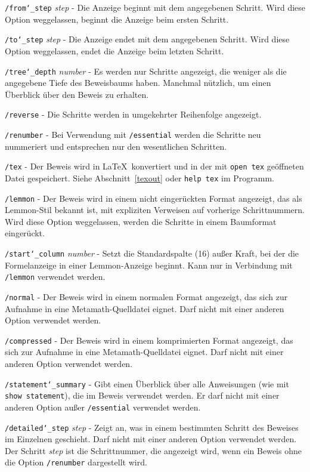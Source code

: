     \texttt{/from{\char`\_}step} {\em step} - Die Anzeige beginnt mit dem angegebenen Schritt.  Wird diese Option weggelassen, beginnt die Anzeige beim ersten Schritt.

    \texttt{/to{\char`\_}step} {\em step} - Die Anzeige endet mit dem angegebenen Schritt.  Wird diese Option weggelassen, endet die Anzeige beim letzten Schritt.

    \texttt{/tree{\char`\_}depth} {\em number} - Es werden nur Schritte angezeigt, die weniger als die angegebene Tiefe des Beweisbaums haben.  Manchmal nützlich, um einen Überblick über den Beweis zu erhalten.

    \texttt{/reverse} - Die Schritte werden in umgekehrter Reihenfolge angezeigt.

    \texttt{/renumber} - Bei Verwendung mit \texttt{/essential} werden die Schritte neu nummeriert und entsprechen nur den wesentlichen Schritten.

    \texttt{/tex} - Der Beweis wird in \LaTeX\ konvertiert und in der mit \texttt{open tex} geöffneten Datei gespeichert.  Siehe Abschnitt~\ref{texout} oder \texttt{help tex} im Programm.

    \texttt{/lemmon} - Der Beweis wird in einem nicht eingerückten Format angezeigt, das als Lemmon-Stil bekannt ist, mit expliziten Verweisen auf vorherige Schrittnummern. Wird diese Option weggelassen, werden die Schritte in einem Baumformat eingerückt.

    \texttt{/start{\char`\_}column} {\em number} - Setzt die Standardspalte (16) außer Kraft, bei der die Formelanzeige in einer Lemmon-Anzeige beginnt.  Kann nur in Verbindung mit \texttt{/lemmon} verwendet werden.

    \texttt{/normal} - Der Beweis wird in einem normalen Format angezeigt, das sich zur Aufnahme in eine Metamath-Quelldatei eignet.  Darf nicht mit einer anderen Option verwendet werden.

    \texttt{/compressed} - Der Beweis wird in einem komprimierten Format angezeigt, das sich zur Aufnahme in eine Metamath-Quelldatei eignet.  Darf nicht mit einer anderen Option verwendet werden.

    \texttt{/statement{\char`\_}summary} - Gibt einen Überblick über alle Anweisungen (wie mit \texttt{show statement}), die im Beweis verwendet werden.  Er darf nicht mit einer anderen Option außer \texttt{/essential} verwendet werden.

    \texttt{/detailed{\char`\_}step} {\em step} - Zeigt an, was in einem bestimmten Schritt des Beweises im Einzelnen geschieht.  Darf nicht mit einer anderen Option verwendet werden.  Der Schritt {\em step} ist die Schrittnummer, die angezeigt wird, wenn ein Beweis ohne die Option \texttt{/renumber} dargestellt wird.



